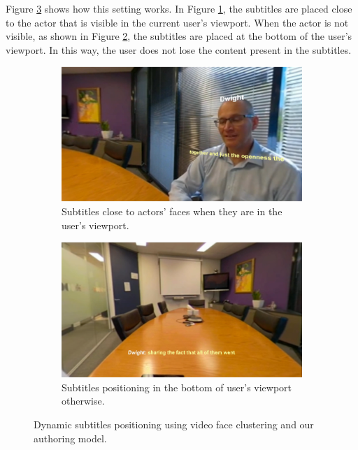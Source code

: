 Figure \ref{fig:dynamic_subtitles} shows how this setting works. In Figure \ref{subfig:subtitles_actor}, the subtitles are placed close to the actor that is visible in the current user's viewport. When the actor is not visible, as shown in Figure \ref{subfig:subtitles_bottom}, the subtitles are placed at the bottom of the user's viewport. In this way, the user does not lose the content present in the subtitles.

\begin{figure}[!ht]
\centering
    \begin{subfigure}{0.49\linewidth}
        \centering
        \includegraphics[width=1\textwidth]{img/video360/subtitles_actor.png}
        \caption{Subtitles close to actors' faces when they are in the user's viewport.}
        \label{subfig:subtitles_actor}
    \end{subfigure}\hfill
    \begin{subfigure}{0.49\linewidth}
        \centering
        \includegraphics[width=1\textwidth]{img/video360/subtitles_bottom.png}
        \caption{Subtitles positioning in the bottom of user's viewport otherwise.}
        \label{subfig:subtitles_bottom}
    \end{subfigure}

\caption{Dynamic subtitles positioning using video face clustering and our authoring model.}
\label{fig:dynamic_subtitles}
\end{figure}

